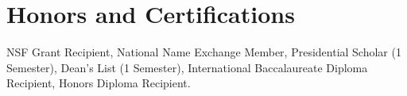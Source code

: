\documentclass[letterpaper,11pt]{article}
\begin{document}
%
\section{Honors and Certifications}
 \begin{itemize}[leftmargin=0.15in, label={}]
    \small{\item{
     \textbf{}{NSF Grant Recipient, National Name Exchange Member, Presidential Scholar (1 Semester), Dean’s List (1 Semester), International Baccalaureate Diploma Recipient, Honors Diploma Recipient.} \\
    }}
 \end{itemize}


\end{document}
